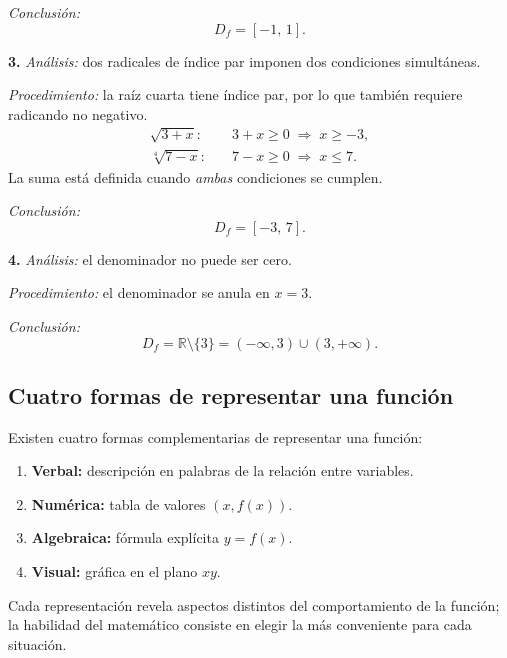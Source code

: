 \begin{prob}
\begin{myproof}
\emph{Conclusión:}
\[
  \boxed{D_f = [-1,\,1].}
\]

\medskip
\textbf{3.} \emph{Análisis:} dos radicales de índice par imponen dos condiciones simultáneas.

\emph{Procedimiento:} la raíz cuarta tiene índice par, por lo que también requiere radicando no negativo.
\begin{align*}
  \sqrt{3+x}:   &\quad 3 + x \geq 0 \;\Rightarrow\; x \geq -3, \\
  \sqrt[4]{7-x}:&\quad 7 - x \geq 0 \;\Rightarrow\; x \leq 7.
\end{align*}
La suma está definida cuando \emph{ambas} condiciones se cumplen.

\emph{Conclusión:}
\[
  \boxed{D_f = [-3,\,7].}
\]

\medskip
\textbf{4.} \emph{Análisis:} el denominador no puede ser cero.

\emph{Procedimiento:} el denominador se anula en $x = 3$.

\emph{Conclusión:}
\[
  \boxed{D_f = \mathbb{R} \setminus \{3\} = (-\infty, 3)\cup(3,+\infty).}
\]
\end{myproof}
\end{prob}



\subsection{Cuatro formas de representar una función}

\begin{rem}
Existen cuatro formas complementarias de representar una función:
\begin{enumerate}
  \item \textbf{Verbal:} descripción en palabras de la relación entre variables.
  \item \textbf{Numérica:} tabla de valores $(x, f(x))$.
  \item \textbf{Algebraica:} fórmula explícita $y = f(x)$.
  \item \textbf{Visual:} gráfica en el plano $xy$.
\end{enumerate}
Cada representación revela aspectos distintos del comportamiento de la función; la habilidad del matemático consiste en elegir la más conveniente para cada situación.
\end{rem}


